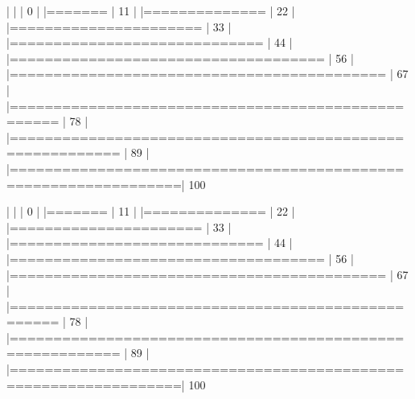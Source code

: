 \documentclass[10pt]{article}
\newenvironment{CodeChunk}{}{}
\begin{document}
\begin{CodeChunk}
\begin{CodeChunk}
\begin{CodeOutput}
  |                                                                       
  |                                                                 |   0%
  |                                                                       
  |=======                                                          |  11%
  |                                                                       
  |==============                                                   |  22%
  |                                                                       
  |======================                                           |  33%
  |                                                                       
  |=============================                                    |  44%
  |                                                                       
  |====================================                             |  56%
  |                                                                       
  |===========================================                      |  67%
  |                                                                       
  |===================================================              |  78%
  |                                                                       
  |==========================================================       |  89%
  |                                                                       
  |=================================================================| 100%

  |                                                                       
  |                                                                 |   0%
  |                                                                       
  |=======                                                          |  11%
  |                                                                       
  |==============                                                   |  22%
  |                                                                       
  |======================                                           |  33%
  |                                                                       
  |=============================                                    |  44%
  |                                                                       
  |====================================                             |  56%
  |                                                                       
  |===========================================                      |  67%
  |                                                                       
  |===================================================              |  78%
  |                                                                       
  |==========================================================       |  89%
  |                                                                       
  |=================================================================| 100%


\end{CodeOutput}
\end{CodeChunk}
\end{CodeChunk}
\end{document}
